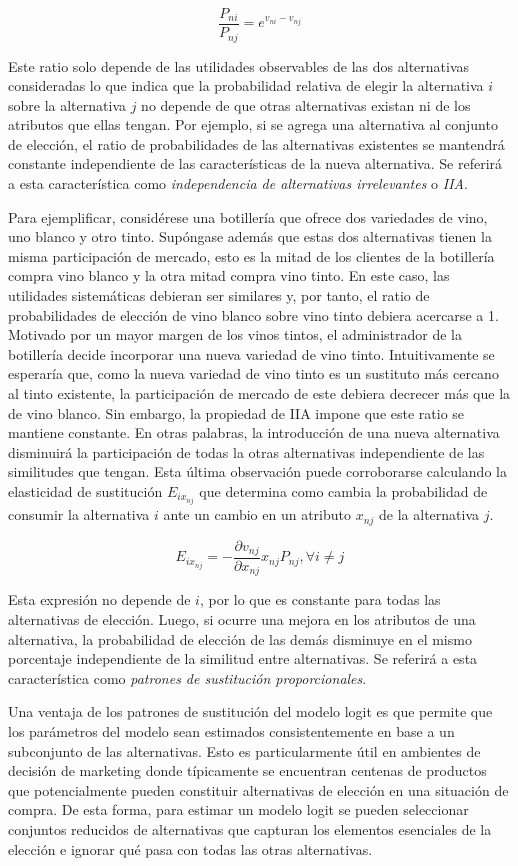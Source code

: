 \documentclass[
]{book}
\begin{document}
\[\frac{P_{ni}}{P_{nj}} = e^{v_{ni} - v_{nj}}\]

Este ratio solo depende de las utilidades observables de las dos alternativas consideradas lo que indica que la probabilidad relativa de elegir la alternativa \(i\) sobre la alternativa \(j\) no depende de que otras alternativas existan ni de los atributos que ellas tengan. Por ejemplo, si se agrega una alternativa al conjunto de elección, el ratio de probabilidades de las alternativas existentes se mantendrá constante independiente de las características de la nueva alternativa. Se referirá a esta característica como \emph{independencia de alternativas irrelevantes} o \emph{IIA}.

Para ejemplificar, considérese una botillería que ofrece dos variedades de vino, uno blanco y otro tinto. Supóngase además que estas dos alternativas tienen la misma participación de
mercado, esto es la mitad de los clientes de la botillería compra vino blanco y la otra mitad compra vino tinto. En este caso, las utilidades sistemáticas debieran ser similares y, por tanto, el ratio de probabilidades de elección de vino blanco sobre vino tinto debiera acercarse a 1. Motivado por un
mayor margen de los vinos tintos, el administrador de la botillería decide incorporar una nueva variedad de vino tinto. Intuitivamente se esperaría que, como la nueva variedad de vino tinto es un sustituto más cercano al tinto existente, la participación de mercado de este debiera decrecer
más que la de vino blanco. Sin embargo, la propiedad de IIA impone que este ratio se mantiene constante. En otras palabras, la introducción de una nueva alternativa disminuirá la participación de todas la otras alternativas independiente de las similitudes que tengan. Esta última observación
puede corroborarse calculando la elasticidad de sustitución \(E_{ix_{nj}}\) que determina como cambia la probabilidad de consumir la alternativa \(i\) ante un cambio en un atributo \(x_{nj}\) de la alternativa \(j\).

\[E_{ix_{nj}} = -\frac{\partial v_{nj}}{\partial x_{nj}}x_{nj} P_{nj}, \forall i \neq j\]

Esta expresión no depende de \(i\), por lo que es constante para todas las alternativas de elección. Luego, si ocurre una mejora en los atributos de una alternativa, la probabilidad de elección de las demás disminuye en el mismo porcentaje independiente de la similitud entre alternativas. Se referirá a esta característica como \emph{patrones de sustitución proporcionales}.

Una ventaja de los patrones de sustitución del modelo logit es que permite que los parámetros del modelo sean estimados consistentemente en base a un subconjunto de las alternativas. Esto es particularmente útil en ambientes de decisión de marketing donde típicamente se encuentran centenas de productos que potencialmente pueden constituir alternativas de elección en una situación de compra. De esta forma, para estimar un modelo logit se pueden seleccionar conjuntos
reducidos de alternativas que capturan los elementos esenciales de la elección e ignorar qué pasa con todas las otras alternativas.
\end{document}
